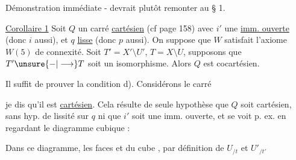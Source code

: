 Démonstration immédiate -  devrait plutôt remonter au § 1.

\uline{Corollaire 1} Soit $Q$ un carré \uline{cartésien} (cf page 158) avec $i'$ une \uline{imm. ouverte} (donc $i$ aussi), et $q$ \uline{lisse} (donc $p$ aussi). On suppose que $W$ satisfait l'axiome $W(5)$ de connexité. Soit $T'=X'\setminus U'$, $T=X\setminus U$, supposons que $T'\unsure{-|\longrightarrow}T$ soit un isomorphisme. Alors $Q$ est cocartésien.


Il suffit de prouver la condition d). Considérons le carré


je dis qu'il est \uline{cartésien}. Cela résulte de  seule hypothèse que $Q$ soit cartésien, sans hyp. de lissité sur $q$ ni que $i'$ soit une imm. ouverte, et se voit p. ex. en regardant le  diagramme cubique :



Dans ce diagramme, les faces  et  du cube  , par définition de $U_{/t}$ et  $U'_{/t'}$

